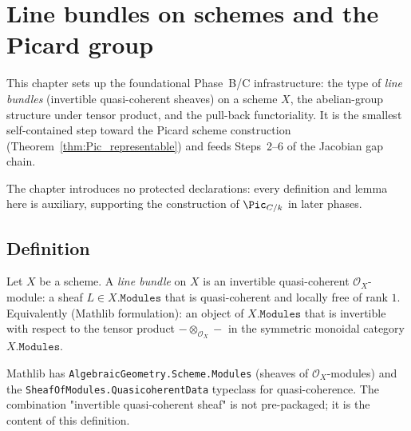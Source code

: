 \chapter{Line bundles on schemes and the Picard group}
\label{chap:Picard_LineBundle}

This chapter sets up the foundational Phase~B/C infrastructure: the type of \emph{line bundles} (invertible quasi-coherent sheaves) on a scheme $X$, the abelian-group structure under tensor product, and the pull-back functoriality. It is the smallest self-contained step toward the Picard scheme construction (Theorem~\ref{thm:Pic_representable}) and feeds Steps~2--6 of the Jacobian gap chain.

The chapter introduces no protected declarations: every definition and lemma here is auxiliary, supporting the construction of $\Pic_{C/k}$ in later phases.

\section{Definition}

\begin{definition}
  \label{def:Scheme_LineBundle}
  \leanok
  Let $X$ be a scheme. A \emph{line bundle} on $X$ is an invertible quasi-coherent $\mathcal O_X$-module: a sheaf $L \in X.\mathtt{Modules}$ that is quasi-coherent and locally free of rank $1$. Equivalently (Mathlib formulation): an object of $X.\mathtt{Modules}$ that is invertible with respect to the tensor product $- \otimes_{\mathcal O_X} -$ in the symmetric monoidal category $X.\mathtt{Modules}$.
\end{definition}

\begin{remark}
  Mathlib has \lstinline{AlgebraicGeometry.Scheme.Modules} (sheaves of $\mathcal O_X$-modules) and the \lstinline{SheafOfModules.QuasicoherentData} typeclass for quasi-coherence. The combination "invertible quasi-coherent sheaf" is not pre-packaged; it is the content of this definition.
\end{remark}

